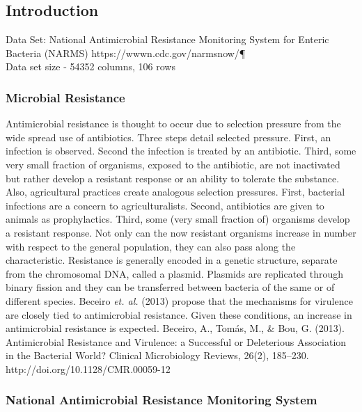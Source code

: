\documentclass[11pt]{article}
\begin{document}
    \hypertarget{introduction}{%
\subsection{Introduction}\label{introduction}}

Data Set: National Antimicrobial Resistance Monitoring System for
Enteric Bacteria (NARMS) https://wwwn.cdc.gov/narmsnow/¶\\
Data set size - 54352 columns, 106 rows

    \hypertarget{microbial-resistance}{%
\subsubsection{Microbial Resistance}\label{microbial-resistance}}

Antimicrobial resistance is thought to occur due to selection pressure
from the wide spread use of antibiotics. Three steps detail selected
pressure. First, an infection is observed. Second the infection is
treated by an antibiotic. Third, some very small fraction of organisms,
exposed to the antibiotic, are not inactivated but rather develop a
resistant response or an ability to tolerate the substance. Also,
agricultural practices create analogous selection pressures. First,
bacterial infections are a concern to agriculturalists. Second,
antibiotics are given to animals as prophylactics. Third, some (very
small fraction of) organisms develop a resistant response. Not only can
the now resistant organisms increase in number with respect to the
general population, they can also pass along the characteristic.
Resistance is generally encoded in a genetic structure, separate from
the chromosomal DNA, called a plasmid. Plasmids are replicated through
binary fission and they can be transferred between bacteria of the same
or of different species. Beceiro \emph{et. al.} (2013) propose that the
mechanisms for virulence are closely tied to antimicrobial resistance.
Given these conditions, an increase in antimicrobial resistance is
expected. Beceiro, A., Tomás, M., \& Bou, G. (2013). Antimicrobial
Resistance and Virulence: a Successful or Deleterious Association in the
Bacterial World? Clinical Microbiology Reviews, 26(2), 185--230.
http://doi.org/10.1128/CMR.00059-12

    \hypertarget{national-antimicrobial-resistance-monitoring-system}{%
\subsubsection{National Antimicrobial Resistance Monitoring
System}\label{national-antimicrobial-resistance-monitoring-system}}
\end{document}
